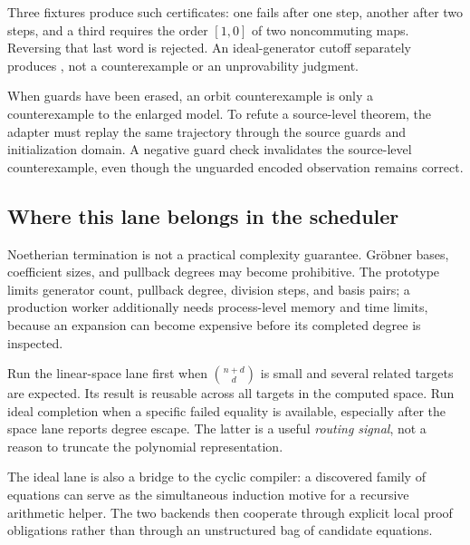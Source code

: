 Three fixtures produce such certificates: one fails after one step, another
after two steps, and a third requires the order $[1,0]$ of two noncommuting
maps. Reversing that last word is rejected. An ideal-generator cutoff separately
produces , not a counterexample or an unprovability judgment.

When guards have been erased, an orbit counterexample is only a counterexample
to the enlarged model. To refute a source-level theorem, the adapter must replay
the same trajectory through the source guards and initialization domain. A
negative guard check invalidates the source-level counterexample, even though
the unguarded encoded observation remains correct.

\subsection{Where this lane belongs in the scheduler}

Noetherian termination is not a practical complexity guarantee. Gr\"obner bases,
coefficient sizes, and pullback degrees may become prohibitive. The prototype
limits generator count, pullback degree, division steps, and basis pairs; a
production worker additionally needs process-level memory and time limits,
because an expansion can become expensive before its completed degree is
inspected.

Run the linear-space lane first when $\binom{n+d}{d}$ is small and several
related targets are expected. Its result is reusable across all targets in the
computed space. Run ideal completion when a specific failed equality is available,
especially after the space lane reports degree escape. The latter is a useful
\emph{routing signal}, not a reason to truncate the polynomial representation.

The ideal lane is also a bridge to the cyclic compiler: a discovered family of
equations can serve as the simultaneous induction motive for a recursive
arithmetic helper. The two backends then cooperate through explicit local proof
obligations rather than through an unstructured bag of candidate equations.
